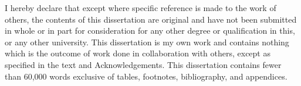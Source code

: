 
\begin{declaration}

I hereby declare that except where specific reference is made to the work of
others, the contents of this dissertation are original and have not been
submitted in whole or in part for consideration for any other degree or
qualification in this, or any other university. This dissertation is my own
work and contains nothing which is the outcome of work done in collaboration
with others, except as specified in the text and Acknowledgements. This
dissertation contains fewer than 60,000 words exclusive of tables, footnotes, bibliography, and appendices.


\end{declaration}
